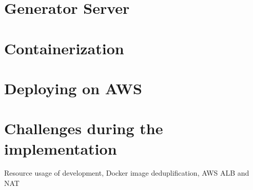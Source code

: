 	\section{Generator Server}

	\section{Containerization}

	\section{Deploying on AWS}

	\section{Challenges during the implementation}
	Resource usage of development, Docker image deduplification, AWS ALB and NAT